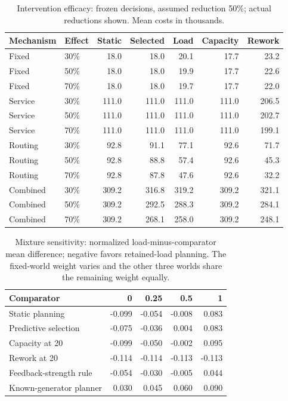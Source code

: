 \begin{table}[p]\caption{Intervention efficacy: frozen decisions, assumed reduction 50\%; actual reductions shown. Mean costs in thousands.}\centering\small\setlength{\tabcolsep}{3pt}\begin{tabular}{llrrrrr}\toprule
Mechanism & Effect & Static & Selected & Load & Capacity & Rework\\\midrule
Fixed & 30\% & 18.0 & 18.0 & 20.1 & 17.7 & 23.2\\
Fixed & 50\% & 18.0 & 18.0 & 19.9 & 17.7 & 22.6\\
Fixed & 70\% & 18.0 & 18.0 & 19.7 & 17.7 & 22.0\\
Service & 30\% & 111.0 & 111.0 & 111.0 & 111.0 & 206.5\\
Service & 50\% & 111.0 & 111.0 & 111.0 & 111.0 & 202.7\\
Service & 70\% & 111.0 & 111.0 & 111.0 & 111.0 & 199.1\\
Routing & 30\% & 92.8 & 91.1 & 77.1 & 92.6 & 71.7\\
Routing & 50\% & 92.8 & 88.8 & 57.4 & 92.6 & 45.3\\
Routing & 70\% & 92.8 & 87.8 & 47.6 & 92.6 & 32.2\\
Combined & 30\% & 309.2 & 316.8 & 319.2 & 309.2 & 321.1\\
Combined & 50\% & 309.2 & 292.5 & 288.3 & 309.2 & 284.1\\
Combined & 70\% & 309.2 & 268.1 & 258.0 & 309.2 & 248.1\\
\bottomrule\end{tabular}\end{table}
\begin{table}[p]\caption{Mixture sensitivity: normalized load-minus-comparator mean difference; negative favors retained-load planning. The fixed-world weight varies and the other three worlds share the remaining weight equally.}\centering\small\setlength{\tabcolsep}{3pt}\begin{tabular}{p{}rrrr}\toprule
Comparator & 0 & 0.25 & 0.5 & 1\\\midrule
Static planning & -0.099 & -0.054 & -0.008 & 0.083\\
Predictive selection & -0.075 & -0.036 & 0.004 & 0.083\\
Capacity at 20 & -0.099 & -0.050 & -0.002 & 0.095\\
Rework at 20 & -0.114 & -0.114 & -0.113 & -0.113\\
Feedback-strength rule & -0.054 & -0.030 & -0.005 & 0.044\\
Known-generator planner & 0.030 & 0.045 & 0.060 & 0.090\\
\bottomrule\end{tabular}\end{table}
